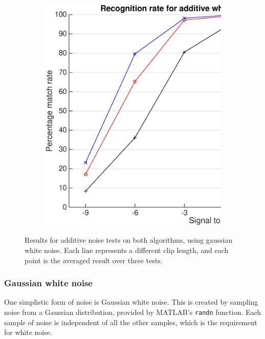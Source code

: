 \documentclass[12pt,a4paper,twoside,openright]{report}
\begin{document}
\begin{figure}[p]
    \begin{subfigure}{\textwidth}
      \includegraphics[width=\textwidth]{./figs/gaussian_shazam_results.eps} 
    \end{subfigure}

    \vspace{15mm}

    \caption{Results for additive noise tests on both algorithms, using gaussian white noise. Each line represents a different clip length, and each point is the averaged result over three tests.}
    \label{fig:gaussian_results}
\end{figure}


\subsubsection{Gaussian white noise}

One simplistic form of noise is Gaussian white noise. This is created by sampling noise from a Gaussian distribution, provided by MATLAB's \lstinline{randn} function. Each sample of noise is independent of all the other samples, which is the requirement for white noise.
\end{document}
